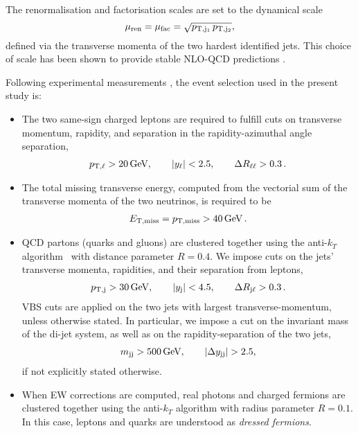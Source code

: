 The renormalisation and factorisation scales are set to the dynamical scale
%
\begin{equation}
\label{eq:defscale}
 \mu_{\rm ren} = \mu_{\rm fac} = \sqrt{p_{\rm T, j_1}\, p_{\rm T, j_2}}, 
\end{equation}
%
defined via the transverse momenta of the two hardest identified jets.  
This choice of scale has been shown to provide stable NLO-QCD predictions \cite{Denner:2012dz}.

Following experimental measurements \cite{Aad:2014zda,Aaboud:2016ffv,Khachatryan:2014sta,CMS:2017adb}, the event selection used in the present study is:

\begin{itemize}
    \item The two same-sign charged leptons are required to fulfill cuts on transverse momentum, rapidity, and separation in the rapidity-azimuthal angle separation, 
        \begin{align}
        \label{cut:1}
         p_{\text{T},\ell} >  20\,\text{GeV},\qquad |y_{\ell}| < 2.5, \qquad \Delta R_{\ell\ell}> 0.3\,.
        \end{align}
    \item The total missing transverse energy, computed from the vectorial sum of the transverse momenta of the two neutrinos, is required to be
        \begin{align}
        \label{cut:2}
          E_{\text{T},\text{miss}}=p_{\rm T, miss} >  40\,\text{GeV}\,.
        \end{align}
    \item QCD partons (quarks and gluons) are clustered together using the anti-$k_T$ algorithm~\cite{Cacciari:2008gp} with distance parameter $R=0.4$. %
    We impose cuts on the jets' transverse momenta, rapidities, and their separation from leptons,  
        \begin{align}
        \label{cut:3}
         p_{\text{T},\text{j}} >  30\,\text{GeV}, \qquad |y_\text{j}| < 4.5, \qquad \Delta R_{\text{j}\ell} > 0.3 \,.
        \end{align}
        VBS cuts are applied on the two jets with largest transverse-momentum, unless otherwise stated. In particular, we impose a cut on the 
         in\-vari\-ant mass of the di-jet system,  as well as on the rapidity-separation of the two jets,          \begin{align}
        \label{cut:4}
         m_{\text{j} \text{j}} >  500\,\text{GeV},\qquad |\Delta y_{\text{j} \text{j}}| > 2.5, 
        \end{align}
        if not explicitly stated otherwise. 
    \item When EW corrections are computed, real photons and charged fermions are clustered together using the anti-$k_T$ algorithm with
        radius parameter $R=0.1$. In this case, leptons and quarks are understood as {\it dressed fermions}.
\end{itemize}
